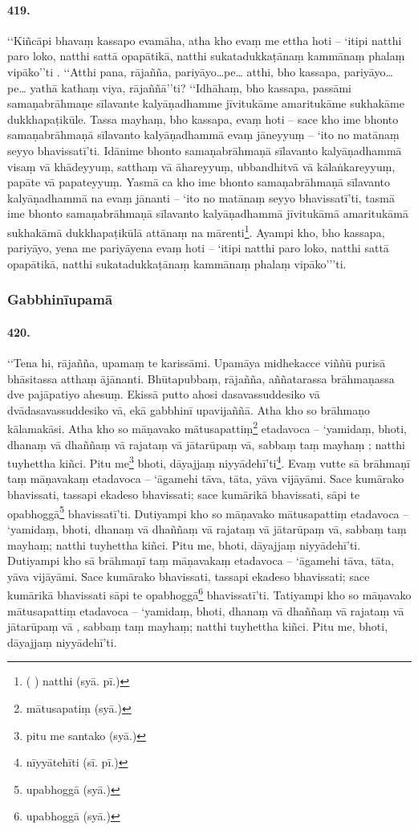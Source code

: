 \paragraph{419.} ‘‘Kiñcāpi bhavaṃ kassapo evamāha, atha kho evaṃ me ettha hoti – ‘itipi natthi paro loko, natthi sattā opapātikā, natthi sukatadukkaṭānaṃ kammānaṃ phalaṃ vipāko’’ti . ‘‘Atthi pana, rājañña, pariyāyo…pe… atthi, bho kassapa, pariyāyo…pe… yathā kathaṃ viya, rājaññā’’ti? ‘‘Idhāhaṃ, bho kassapa, passāmi samaṇabrāhmaṇe sīlavante kalyāṇadhamme jīvitukāme amaritukāme sukhakāme dukkhapaṭikūle. Tassa mayhaṃ, bho kassapa, evaṃ hoti – sace kho ime bhonto samaṇabrāhmaṇā sīlavanto kalyāṇadhammā evaṃ jāneyyuṃ – ‘ito no matānaṃ seyyo bhavissatī’ti. Idānime bhonto samaṇabrāhmaṇā sīlavanto kalyāṇadhammā visaṃ vā khādeyyuṃ, satthaṃ vā āhareyyuṃ, ubbandhitvā vā kālaṅkareyyuṃ, papāte vā papateyyuṃ. Yasmā ca kho ime bhonto samaṇabrāhmaṇā sīlavanto kalyāṇadhammā na evaṃ jānanti – ‘ito no matānaṃ seyyo bhavissatī’ti, tasmā ime bhonto samaṇabrāhmaṇā sīlavanto kalyāṇadhammā jīvitukāmā amaritukāmā sukhakāmā dukkhapaṭikūlā attānaṃ na mārenti\footnote{( ) natthi (syā. pī.)}. Ayampi kho, bho kassapa, pariyāyo, yena me pariyāyena evaṃ hoti – ‘itipi natthi paro loko, natthi sattā opapātikā, natthi sukatadukkaṭānaṃ kammānaṃ phalaṃ vipāko’’’ti.

\subsubsection{Gabbhinīupamā}

\paragraph{420.} ‘‘Tena hi, rājañña, upamaṃ te karissāmi. Upamāya midhekacce viññū purisā bhāsitassa atthaṃ ājānanti. Bhūtapubbaṃ, rājañña, aññatarassa brāhmaṇassa dve pajāpatiyo ahesuṃ. Ekissā putto ahosi dasavassuddesiko vā dvādasavassuddesiko vā, ekā gabbhinī upavijaññā. Atha kho so brāhmaṇo kālamakāsi. Atha kho so māṇavako mātusapattiṃ\footnote{mātusapatiṃ (syā.)} etadavoca – ‘yamidaṃ, bhoti, dhanaṃ vā dhaññaṃ vā rajataṃ vā jātarūpaṃ vā, sabbaṃ taṃ mayhaṃ ; natthi tuyhettha kiñci. Pitu me\footnote{pitu me santako (syā.)} bhoti, dāyajjaṃ niyyādehī’ti\footnote{nīyyātehīti (sī. pī.)}. Evaṃ vutte sā brāhmaṇī taṃ māṇavakaṃ etadavoca – ‘āgamehi tāva, tāta, yāva vijāyāmi. Sace kumārako bhavissati, tassapi ekadeso bhavissati; sace kumārikā bhavissati, sāpi te opabhoggā\footnote{upabhoggā (syā.)} bhavissatī’ti. Dutiyampi kho so māṇavako mātusapattiṃ etadavoca – ‘yamidaṃ, bhoti, dhanaṃ vā dhaññaṃ vā rajataṃ vā jātarūpaṃ vā, sabbaṃ taṃ mayhaṃ; natthi tuyhettha kiñci. Pitu me, bhoti, dāyajjaṃ niyyādehī’ti. Dutiyampi kho sā brāhmaṇī taṃ māṇavakaṃ etadavoca – ‘āgamehi tāva, tāta, yāva vijāyāmi. Sace kumārako bhavissati, tassapi ekadeso bhavissati; sace kumārikā bhavissati sāpi te opabhoggā\footnote{upabhoggā (syā.)} bhavissatī’ti. Tatiyampi kho so māṇavako mātusapattiṃ etadavoca – ‘yamidaṃ, bhoti, dhanaṃ vā dhaññaṃ vā rajataṃ vā jātarūpaṃ vā , sabbaṃ taṃ mayhaṃ; natthi tuyhettha kiñci. Pitu me, bhoti, dāyajjaṃ niyyādehī’ti.

